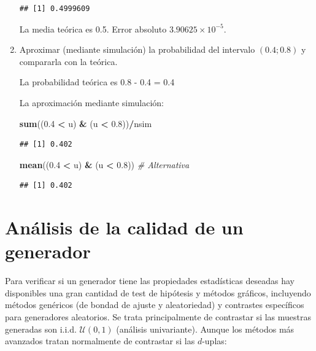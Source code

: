 \documentclass[
]{book}
\newenvironment{Shaded}{\begin{snugshade}}{\end{snugshade}}
\newcommand{\CommentTok}[1]{\textcolor[rgb]{0.56,0.35,0.01}{\textit{#1}}}
\newcommand{\FloatTok}[1]{\textcolor[rgb]{0.00,0.00,0.81}{#1}}
\newcommand{\KeywordTok}[1]{\textcolor[rgb]{0.13,0.29,0.53}{\textbf{#1}}}
\newcommand{\NormalTok}[1]{#1}
\newcommand{\OperatorTok}[1]{\textcolor[rgb]{0.81,0.36,0.00}{\textbf{#1}}}
\newcommand{\StringTok}[1]{\textcolor[rgb]{0.31,0.60,0.02}{#1}}
\theoremstyle{break}
\theoremstyle{definition}
\theoremstyle{definition}
\theoremstyle{definition}
\theoremstyle{remark}
\begin{document}
\begin{enumerate}
\begin{verbatim}
## [1] 0.4999609
\end{verbatim}

  La media teórica es 0.5.
  Error absoluto \(\ensuremath{3.90625\times 10^{-5}}\).
\item
  Aproximar (mediante simulación) la probabilidad del intervalo
  \((0.4;0.8)\) y compararla con la teórica.

  La probabilidad teórica es 0.8 - 0.4 = 0.4

  La aproximación mediante simulación:

\begin{Shaded}
\begin{Highlighting}[]
\KeywordTok{sum}\NormalTok{((}\FloatTok{0.4} \OperatorTok{<}\StringTok{ }\NormalTok{u) }\OperatorTok{&}\StringTok{ }\NormalTok{(u }\OperatorTok{<}\StringTok{ }\FloatTok{0.8}\NormalTok{))}\OperatorTok{/}\NormalTok{nsim}
\end{Highlighting}
\end{Shaded}

\begin{verbatim}
## [1] 0.402
\end{verbatim}

\begin{Shaded}
\begin{Highlighting}[]
\KeywordTok{mean}\NormalTok{((}\FloatTok{0.4} \OperatorTok{<}\StringTok{ }\NormalTok{u) }\OperatorTok{&}\StringTok{ }\NormalTok{(u }\OperatorTok{<}\StringTok{ }\FloatTok{0.8}\NormalTok{))     }\CommentTok{# Alternativa}
\end{Highlighting}
\end{Shaded}

\begin{verbatim}
## [1] 0.402
\end{verbatim}
\end{enumerate}

\hypertarget{calgen}{%
\section{Análisis de la calidad de un generador}\label{calgen}}

Para verificar si un generador tiene las propiedades estadísticas deseadas hay disponibles una gran cantidad de test de hipótesis y métodos gráficos,
incluyendo métodos genéricos (de bondad de ajuste y aleatoriedad) y contrastes específicos para generadores aleatorios.
Se trata principalmente de contrastar si las muestras generadas son i.i.d. \(\mathcal{U}\left(0,1\right)\) (análisis univariante).
Aunque los métodos más avanzados tratan normalmente de contrastar si las \(d\)-uplas:
\end{document}
